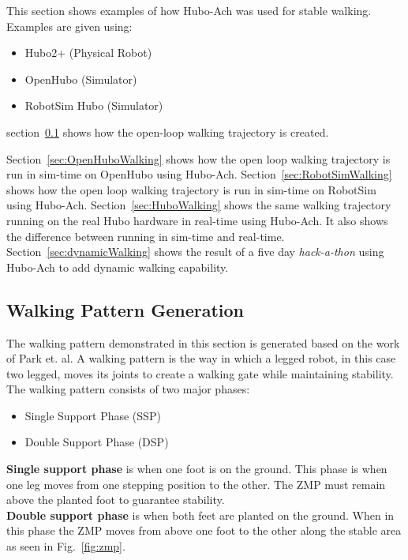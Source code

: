 This section shows examples of how Hubo-Ach was used for stable walking.
Examples are given using:
\begin{itemize}
\item Hubo2+ (Physical Robot)
\item OpenHubo (Simulator)
\item RobotSim Hubo (Simulator)
\end{itemize}

section~\ref{sec:WalkingPatternGeneration} shows how the open-loop walking trajectory is created.

Section~\ref{sec:OpenHuboWalking} shows how the open loop walking trajectory is run in sim-time on OpenHubo using Hubo-Ach.
Section~\ref{sec:RobotSimWalking} shows how the open loop walking trajectory is run in sim-time on RobotSim using Hubo-Ach.
Section~\ref{sec:HuboWalking} shows the same walking trajectory running on the real Hubo hardware in real-time using Hubo-Ach.
It also shows the difference between running in sim-time and real-time.
Section~\ref{sec:dynamicWalking} shows the result of a five day \textit{hack-a-thon} using Hubo-Ach to add dynamic walking capability.





\subsection{Walking Pattern Generation}\label{sec:WalkingPatternGeneration}
The walking pattern demonstrated in this section is generated based on the work of Park et. al.\cite{4115633}
A walking pattern is the way in which a legged robot, in this case two legged, moves its joints to create a walking gate while maintaining stability.
The walking pattern consists of two major phases:
\begin{itemize}
\item Single Support Phase (SSP)
\item Double Support Phase (DSP)
\end{itemize}

\noindent \textbf{Single support phase} is when one foot is on the ground.
This phase is when one leg moves from one stepping position to the other.
The ZMP must remain above the planted foot to guarantee stability.\\

\noindent \textbf{Double support phase} is when both feet are planted on the ground.  
When in this phase the ZMP moves from above one foot to the other along the stable area as seen in Fig.~\ref{fig:zmp}.




